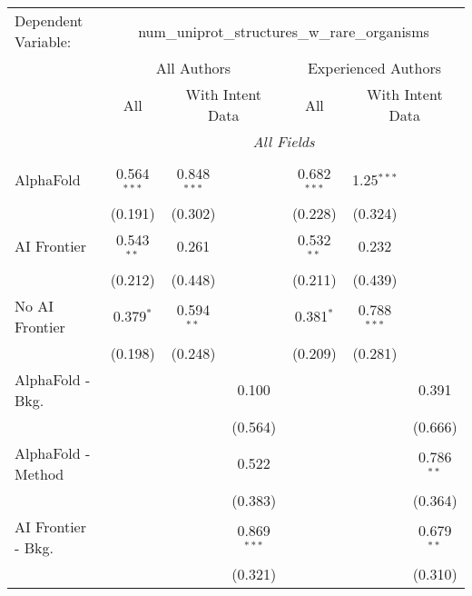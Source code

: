 \begingroup
\centering
\begin{tabular}{lcccccc}
   \tabularnewline \midrule \midrule
   Dependent Variable: & \multicolumn{6}{c}{num\_uniprot\_structures\_w\_rare\_organisms}\\
 & \multicolumn{3}{c}{All Authors} & \multicolumn{3}{c}{Experienced Authors} \\
\cmidrule(lr){2-4} \cmidrule(lr){5-7}
 & \multicolumn{1}{c}{All} & \multicolumn{2}{c}{With Intent Data} & \multicolumn{1}{c}{All} & \multicolumn{2}{c}{With Intent Data} \\
\cmidrule(lr){2-2} \cmidrule(lr){3-4} \cmidrule(lr){5-5} \cmidrule(lr){6-7}
 & \multicolumn{6}{c}{\textit{All Fields}} \\ \\
   AlphaFold               & 0.564$^{***}$ & 0.848$^{***}$ &               & 0.682$^{***}$ & 1.25$^{***}$  &   \\   
                           & (0.191)       & (0.302)       &               & (0.228)       & (0.324)       &   \\   
   AI Frontier             & 0.543$^{**}$  & 0.261         &               & 0.532$^{**}$  & 0.232         &   \\   
                           & (0.212)       & (0.448)       &               & (0.211)       & (0.439)       &   \\   
   No AI Frontier          & 0.379$^{*}$   & 0.594$^{**}$  &               & 0.381$^{*}$   & 0.788$^{***}$ &   \\   
                           & (0.198)       & (0.248)       &               & (0.209)       & (0.281)       &   \\   
   AlphaFold - Bkg.        &               &               & 0.100         &               &               & 0.391\\   
                           &               &               & (0.564)       &               &               & (0.666)\\   
   AlphaFold - Method      &               &               & 0.522         &               &               & 0.786$^{**}$\\   
                           &               &               & (0.383)       &               &               & (0.364)\\   
   AI Frontier - Bkg.      &               &               & 0.869$^{***}$ &               &               & 0.679$^{**}$\\   
                           &               &               & (0.321)       &               &               & (0.310)\\   

\end{tabular}
